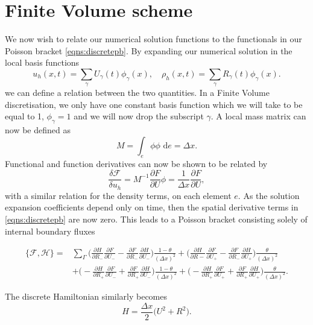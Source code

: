 \documentclass[a4paper,11pt]{article}
\begin{document}
\section{Finite Volume scheme}


We now wish to relate our numerical solution functions to the functionals in our Poisson bracket \eqref{eqns:discretepb}.
By expanding  our numerical solution in the local basis functions
\[ u_h(x,t) = \sum_\gamma U_\gamma (t) \phi_\gamma(x), \quad \rho_h(x,t) = \sum_\gamma R_\gamma (t) \phi_\gamma(x).\]
we can define a relation between the two quantities. 
In a  Finite Volume discretisation, we only have one constant basis function which we will take to be equal to 1, $\phi_\gamma = 1$ and we will now drop the subscript $\gamma$.
A local mass matrix can now be defined as  
\[ M = \int_e \phi \phi \text{ d}e = \Delta x.\]
Functional and function derivatives can now be shown to be related by
\[  \frac{\delta  \mathcal{F}}{\delta u_h}  =  M^{-1} \frac{\partial F}{\partial U} \phi = \frac{1}{\Delta x}  \frac{\partial F}{\partial U},\]
with a similar relation for the density terms, on each element $e$.
As the solution expansion coefficients depend only on time, then the spatial derivative terms  in \eqref{eqns:discretepb} are now zero. This leads to a Poisson bracket consisting solely of internal boundary fluxes


 \begin{equation}
\begin{aligned}
 \{ \mathcal{F},  \mathcal{H}\} = & \sum_\Gamma \bigg ( \frac{\partial H}{\partial R_-}\frac{\partial F}{\partial U_-} - \frac{\partial F}{\partial R_-}\frac{\partial H}{\partial U_-}\bigg  ) \frac{1-\theta}{(\Delta x)^2} +  \bigg  ( \frac{\partial H}{\partial R-}\frac{\partial F}{\partial U_+} - \frac{\partial F}{\partial R_-}\frac{\partial H}{\partial U_+}\bigg  ) \frac{\theta}{(\Delta x)^2} \\
 & + \bigg  ( - \frac{\partial H}{\partial R_+}\frac{\partial F}{\partial U_-} + \frac{\partial F}{\partial R_+}\frac{\partial H}{\partial U_-}\bigg  ) \frac{1-\theta}{(\Delta x)^2}  + \bigg  ( - \frac{\partial H}{\partial R_+}\frac{\partial F}{\partial U_+} + \frac{\partial F}{\partial R_+}\frac{\partial H}{\partial U_+}\bigg  ) \frac{\theta}{(\Delta x)^2} .
 \end{aligned}
 \end{equation}


The discrete Hamiltonian similarly becomes 
\[ H =  \frac{\Delta x}{2}\bigg ( U^2 + R^2 \bigg).\]
\end{document}
